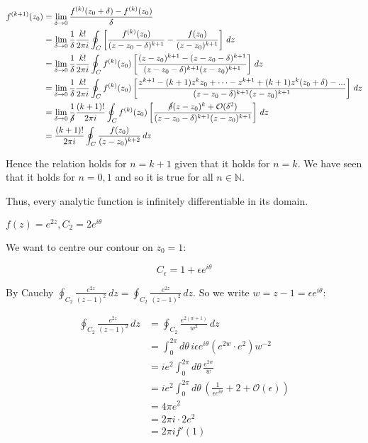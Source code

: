 \documentclass{physics_notes}
\begin{document}
\begin{align*}
f^{(k+1)}(z_0) &=  \lim_{\delta \to 0} \frac{f^{(k)}(z_0 + \delta) - f^{(k)}(z_0)}{\delta} \\
&= \lim_{\delta \to 0} \frac{1}{\delta} \frac{k!}{2\pi i} \oint_C \left[\frac{f^{(k)}(z_0)}{(z - z_0 - \delta)^{k+1}} - \frac{f(z_0)}{(z - z_0)^{k+1}}\right] \, dz \\
&= \lim_{\delta \to 0} \frac{1}{\delta} \frac{k!}{2\pi i} \oint_C f^{(k)}(z_0) \left[\frac{(z - z_0)^{k+1} - (z - z_0 - \delta)^{k + 1}}{(z - z_0 - \delta)^{k+1} (z-z_0)^{k+1}}\right] \, dz \\
&= \lim_{\delta \to 0} \frac{1}{\delta} \frac{k!}{2\pi i} \oint_C f^{(k)}(z_0) \left[\frac{z^{k+1} - (k+1)z^{k}z_0 + \dots - z^{k+1} + (k+1)z^{k}(z_0 + \delta) - ...}{(z - z_0 - \delta)^{k+1} (z-z_0)^{k+1}}\right] \, dz \\
&= \lim_{\delta \to 0} \frac{1}{\cancel{\delta}} \frac{(k+1)!}{2\pi i} \oint_C f^{(k)}(z_0) \left[\frac{\cancel{\delta}(z - z_0)^{k} + \mathcal{O}(\delta^2)}{(z - z_0 - \delta)^{k+1} (z-z_0)^{k+1}}\right] \, dz \\
&= \frac{(k+1)!}{2\pi i} \oint_C \frac{f(z_0)}{(z - z_0)^{k+2}} \, dz
\end{align*}

Hence the relation holds for $n = k + 1$ given that it holds for $n = k$. We have seen that it holds for $n = 0,1$ and so it is true for all $n \in \mathbb{N}$.

Thus, every analytic function is infinitely differentiable in its domain. 

\begin{example}{$f(z) = e^{2z}, C_2 = 2e^{i\theta}$}

We want to centre our contour on $z_0 = 1$:

\[ C_\epsilon = 1 + \epsilon e^{i\theta} \]

By Cauchy $\oint_{C_2} \frac{e^{2z}}{(z-1)^2} \, dz = \oint_{C_2} \frac{e^{2z}}{(z-1)^2} \, dz$. So we write $w = z - 1 = \epsilon e^{i\theta}$:

\begin{align*}
\oint_{C_2} \frac{e^{2z}}{(z-1)^2} \, dz &= \oint_{C_2} \frac{e^{2(w+1)}}{w^2} \, dz \\
&= \int_0^{2\pi} d\theta \, i\epsilon e^{i\theta} (e^{2w} \cdot e^2) w^{-2} \\
&= ie^{2} \int_{0}^{2\pi} d\theta \, \frac{e^{2w}}{w} \\
&= ie^2 \int_0^{2\pi} d\theta \, \left(\frac{1}{\epsilon e^{i\theta}} + 2 + \mathcal{O}(\epsilon)\right) \\
&= 4\pi e^2 \\
&= 2\pi i \cdot 2e^2 \\
&= 2\pi i f'(1)
\end{align*}
\end{example}
\end{document}

